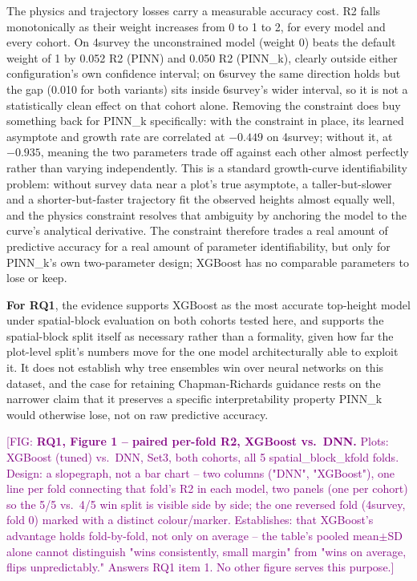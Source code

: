 \documentclass[11pt,a4paper]{report}
\newcommand{\fig}[1]{\textcolor{purple}{[FIG: #1]}}
\begin{document}
The physics and trajectory losses carry a measurable accuracy cost. R2 falls
monotonically as their weight increases from 0 to 1 to 2, for every model and every
cohort. On 4survey the unconstrained model (weight 0) beats the default weight of 1 by
0.052 R2 (PINN) and 0.050 R2 (PINN\_k), clearly outside either configuration's own
confidence interval; on 6survey the same direction holds but the gap (0.010 for both
variants) sits inside 6survey's wider interval, so it is not a statistically clean
effect on that cohort alone. Removing the constraint does buy something back for
PINN\_k specifically: with the constraint in place, its learned asymptote and growth
rate are correlated at $-0.449$ on 4survey; without it, at $-0.935$, meaning the two
parameters trade off against each other almost perfectly rather than varying
independently. This is a standard growth-curve identifiability problem: without
survey data near a plot's true asymptote, a taller-but-slower and a shorter-but-faster
trajectory fit the observed heights almost equally well, and the physics constraint
resolves that ambiguity by anchoring the model to the curve's analytical derivative.
The constraint therefore trades a real amount of predictive accuracy for a real amount
of parameter identifiability, but only for PINN\_k's own two-parameter design; XGBoost
has no comparable parameters to lose or keep.

\textbf{For RQ1}, the evidence supports XGBoost as the most accurate top-height model
under spatial-block evaluation on both cohorts tested here, and supports the
spatial-block split itself as necessary rather than a formality, given how far the
plot-level split's numbers move for the one model architecturally able to exploit it.
It does not establish why tree ensembles win over neural networks on this dataset, and
the case for retaining Chapman-Richards guidance rests on the narrower claim that it
preserves a specific interpretability property PINN\_k would otherwise lose, not on
raw predictive accuracy.

\fig{\textbf{RQ1, Figure 1 -- paired per-fold R2, XGBoost vs.\ DNN.} Plots: XGBoost
(tuned) vs.\ DNN, Set3, both cohorts, all 5 spatial\_block\_kfold folds. Design: a
slopegraph, not a bar chart -- two columns ("DNN", "XGBoost"), one line per fold
connecting that fold's R2 in each model, two panels (one per cohort) so the 5/5 vs.\
4/5 win split is visible side by side; the one reversed fold (4survey, fold 0) marked
with a distinct colour/marker. Establishes: that XGBoost's advantage holds fold-by-fold,
not only on average -- the table's pooled mean$\pm$SD alone cannot distinguish "wins
consistently, small margin" from "wins on average, flips unpredictably." Answers RQ1
item 1. No other figure serves this purpose.}
\end{document}
